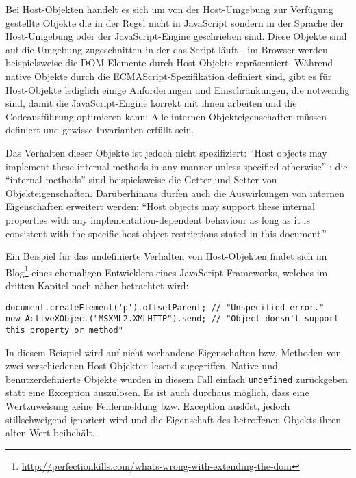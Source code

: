 Bei Host-Objekten handelt es sich um von der Host-Umgebung zur Verfügung gestellte Objekte die in
der Regel nicht in JavaScript sondern in der Sprache der Host-Umgebung oder der JavaScript-Engine
geschrieben sind. Diese Objekte sind auf die Umgebung zugeschnitten in der das Script läuft - im
Browser werden beispielsweise die DOM-Elemente durch Host-Objekte repräsentiert.
Während native Objekte durch die ECMAScript-Spezifikation definiert sind, gibt es für Host-Objekte
lediglich einige Anforderungen und Einschränkungen, die notwendig sind, damit die JavaScript-Engine
korrekt mit ihnen arbeiten und die Codeausführung optimieren kann: Alle internen Objekteigenschaften
müssen definiert und gewisse Invarianten erfüllt sein.

Das Verhalten dieser Objekte ist jedoch nicht
spezifiziert: \enquote{Host objects may implement these internal methods in any manner unless specified
otherwise} \citep[Kap. 8.6.2]{ecmascript}; die \enquote{internal methods} sind beispielsweise die Getter
und Setter von Objekteigenschaften. Darüberhinaus dürfen auch die Auswirkungen von internen
Eigenschaften erweitert werden: \enquote{Host objects may support these internal properties with any
implementation-dependent behaviour as long as it is consistent with the specific host object
restrictions stated in this document.} \citep[Kap. 8.6.2]{ecmascript}

Ein Beispiel für das undefinierte Verhalten von Host-Objekten findet sich im
Blog\footnote{\href{http://perfectionkills.com/whats-wrong-with-extending-the-dom}{http://perfectionkills.com/whats-wrong-with-extending-the-dom}}
eines ehemaligen Entwicklers eines JavaScript-Frameworks, welches im dritten Kapitel noch näher
betrachtet wird:

\begin{lstlisting}[caption=Verhalten von Host-Objekten im Internet Explorer]
document.createElement('p').offsetParent; // "Unspecified error."
new ActiveXObject("MSXML2.XMLHTTP").send; // "Object doesn't support this property or method"
\end{lstlisting}

In diesem Beispiel wird auf nicht vorhandene Eigenschaften bzw. Methoden von zwei verschiedenen
Host-Objekten lesend zugegriffen. Native und benutzerdefinierte Objekte würden in diesem Fall
einfach \lstinline{undefined} zurückgeben statt eine Exception auszulösen.
Es ist auch durchaus möglich, dass eine Wertzuweisung keine Fehlermeldung bzw. Exception auslöst,
jedoch stillschweigend ignoriert wird und die Eigenschaft des betroffenen Objekts ihren alten Wert
beibehält.


